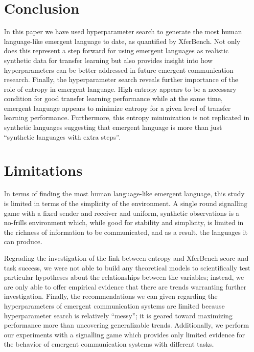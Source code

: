\section{Conclusion}
\unskip\label{hpo:sec:conclusion}
In this paper we have used hyperparameter search to generate the most human language-like emergent language to date, as quantified by XferBench.
Not only does this represent a step forward for using emergent languages as realistic synthetic data for transfer learning but also provides insight into how hyperparameters can be better addressed in future emergent communication research.
Finally, the hyperparameter search reveals further importance of the role of entropy in emergent language.
High entropy appears to be a necessary condition for good transfer learning performance while at the same time, emergent language appears to minimize entropy for a given level of transfer learning performance.
Furthermore, this entropy minimization is not replicated in synthetic languages suggesting that emergent language is more than just ``synthetic languages with extra steps''.


\section*{Limitations}
In terms of finding the most human language-like emergent language, this study is limited in terms of the simplicity of the environment.
A single round signalling game with a fixed sender and receiver and uniform, synthetic observations is a no-frills environment which, while good for stability and simplicity, is limited in the richness of information to be communicated, and as a result, the languages it can produce.

Regrading the investigation of the link between entropy and XferBench score and task success, we were not able to build any theoretical models to scientifically test particular hypotheses about the relationships between the variables; instead, we are only able to offer empirical evidence that there are trends warranting further investigation.
Finally, the recommendations we can given regarding the hyperparameters of emergent communication systems are limited because hyperparameter search is relatively ``messy''; it is geared toward maximizing performance more than uncovering generalizable trends.
Additionally, we perform our experiments with a signalling game which provides only limited evidence for the behavior of emergent communication systems with different tasks.
